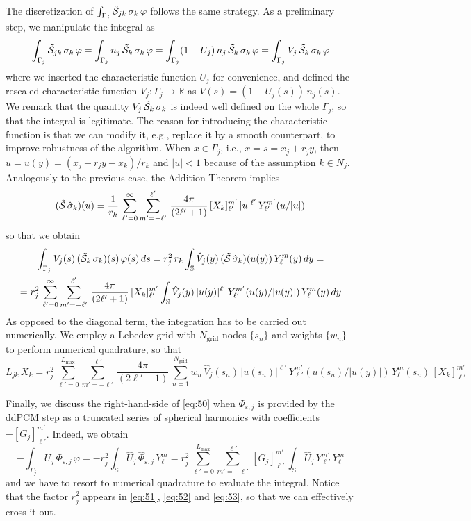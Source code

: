 The discretization of $\int_{\Gamma_j} \tilde{\mathcal{S}}_{jk} \, \sigma_k \, \varphi $ follows the same strategy. As a preliminary step, we manipulate the integral as
\[
\int_{\Gamma_j} \tilde{\mathcal{S}}_{jk} \, \sigma_k \, \varphi =\int_{\Gamma_j} n_j \, \tilde{\mathcal{S}}_{k} \, \sigma_k \, \varphi = \int_{\Gamma_j} (1 - U_j ) \,n_j \, \tilde{\mathcal{S}}_{k} \, \sigma_k \, \varphi = \int_{\Gamma_j} V_j \, \tilde{\mathcal{S}}_{k} \, \sigma_k \, \varphi
\]
where we inserted the characteristic function $U_j$ for convenience, and defined the rescaled characteristic function $V_j : \Gamma_j \to \mathbb{R}$ as $V(s) = (1 - U_j(s)) \, n_j(s)$. We remark that the quantity $V_j \, \tilde{\mathcal{S}}_{k} \, \sigma_k $ is indeed well defined on the whole $\Gamma_j$, so that the integral is legitimate. The reason for introducing the characteristic function is that we can modify it, e.g., replace it by a smooth counterpart, to improve robustness of the algorithm. When $x \in \Gamma_j$, i.e., $x = s = x_j + r_j y$, then $u = u(y) = (x_j + r_j y -x_k)/r_k$ and $|u| < 1$ because of the assumption $k \in N_j$. Analogously to the previous case, the Addition Theorem implies
\[
(\tilde{\mathcal{S}} \, \hat{\sigma}_k)(u) = \frac{1}{r_k} \, \sum_{\ell'= 0}^{\infty} \sum_{m' = -\ell'}^{\ell'} \, \frac{4\pi}{(2\ell' + 1)}\, [X_k]_{\ell'}^{m'} \, |u|^{\ell'} \, Y_{\ell'}^{m'}(u/|u|)
\]
so that we obtain
\begin{multline*}
\int_{\Gamma_j} V_j(s) \, (\tilde{\mathcal{S}}_{k} \, \sigma_k)(s) \, \varphi(s) \, ds =  r_j^2 \,r_k \int_\mathbb{S} \hat{V}_j(y) \, (\tilde{\mathcal{S}} \, \hat{\sigma}_k)(u(y)) \, Y_\ell^m(y) \, dy = \\
= r_j^2 \, \sum_{\ell'= 0}^{\infty} \sum_{m' = -\ell'}^{\ell'} \, \frac{4\pi}{(2\ell' + 1)}\, [X_k]_{\ell'}^{m'} \int_\mathbb{S} \hat{V}_j(y) \, |u(y)|^{\ell'} \, Y_{\ell'}^{m'}(u(y)/|u(y)|) \, Y_\ell^m(y) \, dy
\end{multline*}
As opposed to the diagonal term, the integration has to be carried out numerically. We employ a Lebedev grid with $N_\text{grid}$ nodes $\{s_n\}$ and weights $\{ w_n \}$ to perform numerical quadrature, so that
\begin{equation}\label{eq:52}
L_{jk} \, X_k = r_j^2 \, \sum_{\ell'= 0}^{L_\text{max}}  \sum_{m' = -\ell'}^{\ell'} \, \frac{4\pi}{(2\ell' + 1)}\, \sum_{n = 1}^{N_\text{grid}} w_n \, \hat{V}_j(s_n) \, |u(s_n)|^{\ell'} \, Y_{\ell'}^{m'}(u(s_n)/|u(y)|) \, Y_\ell^m(s_n)\, [X_k]_{\ell'}^{m'}  
\end{equation}

Finally, we discuss the right-hand-side of \eqref{eq:50} when $\Phi_{\varepsilon,j}$ is provided by the ddPCM step as a truncated series of spherical harmonics with coefficients $-[G_j]_{\ell'}^{m'}$. Indeed, we obtain
\begin{equation}\label{eq:53}
-\int_{\Gamma_j} U_j \, \Phi_{\varepsilon,j} \, \varphi =  - r_j^2 \int_\mathbb{S} \hat{U}_j \, \hat{\Phi}_{\varepsilon,j} \, Y_\ell^m = r_j^2 \,  \sum_{\ell'= 0}^{L_\text{max}} \sum_{m' = -\ell'}^{\ell'} \, [G_j]_{\ell'}^{m'} \,  \int_{\mathbb{S}} \hat{U}_j \, Y_{\ell'}^{m'} \, Y_\ell^m 
\end{equation}
and we have to resort to numerical quadrature to evaluate the integral.  Notice that the factor $r_j^2$ appears in \eqref{eq:51}, \eqref{eq:52} and \eqref{eq:53}, so that we can effectively cross it out.
